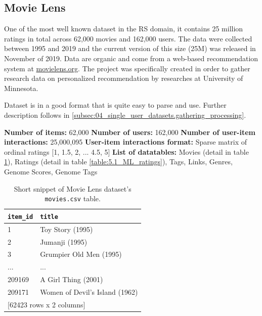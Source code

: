 \subsection{Movie Lens}
One of the most well known dataset in the RS domain, it contains 25 million ratings in total across 62,000 movies and 162,000 users. The data were collected between 1995 and 2019 and the current version of this size (25M) was released in November of 2019. Data are organic and come from a web-based recommendation system at \href{https://movielens.org/}{movielens.org}. The project was specifically created in order to gather research data on personalized recommendation by researches at University of Minnesota.

Dataset is in a good format that is quite easy to parse and use. Further description follows in \ref{subsec:04_single_user_datasets.gathering_processing}.

\hfill \break
\noindent
\textbf{Number of items:} 62,000 \newline
\textbf{Number of users:} 162,000 \newline
\textbf{Number of user-item interactions:} 25,000,095 \newline
\textbf{User-item interactions format:} Sparse matrix of ordinal ratings [1, 1.5, 2, ... 4.5, 5] \newline
\textbf{List of datatables:} Movies (detail in table \ref{table:5.1_ML_movies}), Ratings (detail in table \ref{table:5.1_ML_ratings}), Tags, Links, Genres, Genome Scores, Genome Tags

\begin{table}[!ht]
\centering
\begin{tabular}{ l l }
\verb|item_id| & \verb|title| \\
    \hline
     1  &                   Toy Story (1995) \\
     2  &                     Jumanji (1995) \\
     3  &            Grumpier Old Men (1995) \\
   ...  &                                ... \\
209169  &                A Girl Thing (2001) \\
209171  &     Women of Devil's Island (1962) \\ [1mm]
\multicolumn{2}{l}{{[62423 rows x 2 columns]}}
\end{tabular}
\caption{Short snippet of Movie Lens dataset's \texttt{movies.csv} table.}
\label{table:5.1_ML_movies}
\end{table}

